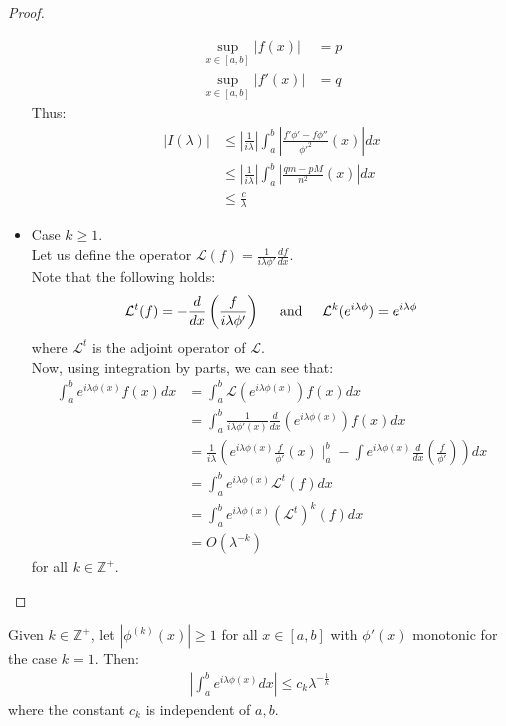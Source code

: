 \begin{proof}{}
\begin{itemize}
\begin{align*}
        \sup_{x\in[a,b]}|f(x)|&=p\\
        \sup_{x\in[a,b]}|f'(x)|&=q
      \end{align*}
      Thus:
      \begin{align*}
        |I(\lambda)|&\leq \left| \frac{1}{i\lambda} \right|\int_{a}^{b}\left|\frac{f'\phi'-f\phi''}{\phi'^2}(x) \right|dx\\
        &\leq \left| \frac{1}{i\lambda} \right|\int_{a}^{b}\left|\frac{qm-pM}{n^2}(x) \right|dx\\
        &\leq \frac{c}{\lambda}
      \end{align*}
    \item Case $k\geq 1$.\\
      Let us define the operator $\mathcal{L}(f)=\frac{1}{i\lambda\phi'}\frac{df}{dx}$.\\
      Note that the following holds:
      $$\mathcal{L}^t(f)=-\frac{d}{dx}\left(\frac{f}{i\lambda\phi'}\right)\hspace{0.5cm}\text{and}\hspace{0.5cm}\mathcal{L}^k(e^{i\lambda\phi})=e^{i\lambda\phi}$$
      where $\mathcal{L}^t$ is the adjoint operator of $\mathcal{L}$.\\
      Now, using integration by parts, we can see that:
      \begin{align*}
        \int_{a}^{b}e^{i\lambda\phi(x)}f(x)dx&=\int_{a}^{b}\mathcal{L}(e^{i\lambda\phi(x)})f(x)dx\\
        &=\int_{a}^{b}\frac{1}{i\lambda\phi'(x)}\frac{d}{dx}(e^{i\lambda\phi(x)})f(x)dx\\
        &=\frac{1}{i\lambda}\left(e^{i\lambda\phi(x)}\frac{f}{\phi'}(x)\mid_{a}^{b}-\int e^{i\lambda\phi(x)}\frac{d}{dx}\left(\frac{f}{\phi'}\right)\right)dx\\
        &=\int_{a}^{b}e^{i\lambda\phi(x)}\mathcal{L}^t(f)dx\\
        &=\int_{a}^{b}e^{i\lambda\phi(x)}(\mathcal{L}^t)^k(f)dx\\
        &=O(\lambda^{-k})
      \end{align*}
      for all $k\in\mathbb{Z}^+$.
  \end{itemize}
\end{proof}
\begin{proposition}{}
  Given $k\in\mathbb{Z}^+$, let $|\phi^{(k)}(x)|\geq 1$ for all $x\in[a,b]$ with $\phi'(x)$ monotonic for the case $k=1$. Then:
  \begin{align*}
    \left| \int_{a}^{b} e^{i\lambda\phi(x)}dx\right|\leq c_k\lambda^{-\frac{1}{k}}
  \end{align*}
  where the constant $c_k$ is independent of $a,b$.
\end{proposition}
